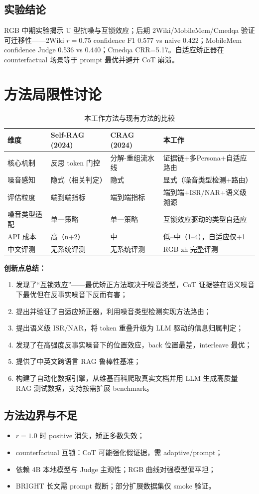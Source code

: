 \documentclass[UTF8,zihao=-4]{ctexart}
\begin{document}
\subsection{实验结论}
RGB 中期实验揭示 U 型抗噪与互锁效应；后期 2Wiki/MobileMem/Cmedqa 验证可迁移性——2Wiki $r=0.75$ confidence F1 0.577 vs naive 0.422；MobileMem confidence Judge 0.536 vs 0.440；Cmedqa CRR=5.17。自适应矫正器在 counterfactual 场景等于 prompt 最优并避开 CoT 崩溃。

\section{方法局限性讨论}

\begin{table}[H]
  \centering
  \caption{本工作方法与现有方法的比较}
  \begin{tabularx}{\textwidth}{lYYY}
    \toprule
    维度 & Self-RAG (2024) & CRAG (2024) & 本工作 \\
    \midrule
    核心机制 & 反思 token 门控 & 分解-重组流水线 & 证据链+多Persona+自适应路由 \\
    噪音感知 & 隐式（相关判定） & 隐式 & 显式（噪音类型检测+路由） \\
    评估粒度 & 端到端指标 & 端到端指标 & 端到端+ISR/NAR+语义级溯源 \\
    噪音类型适配 & 单一策略 & 单一策略 & 互锁效应驱动的类型自适应 \\
    API 成本 & 高（n+2） & 中 & 低--中（1--4），自适应仅+1 \\
    中文评测 & 无系统评测 & 无系统评测 & RGB zh 完整评测 \\
    \bottomrule
  \end{tabularx}
\end{table}

\textbf{创新点总结：}
\begin{enumerate}
  \item 发现了“互锁效应”——最优矫正方法取决于噪音类型，CoT 证据链在语义噪音下最优但在反事实噪音下反而有害；
  \item 提出并验证了自适应矫正器，利用噪音类型检测实现方法路由；
  \item 提出语义级 ISR/NAR，将 token 重叠升级为 LLM 驱动的信息归属判定；
  \item 发现了在高强度反事实噪音下的位置效应，back 位置最差，interleave 最优；
  \item 提供了中英文跨语言 RAG 鲁棒性基准；
  \item 构建了自动化数据引擎，从维基百科爬取真实文档并用 LLM 生成高质量 RAG 测试数据，支持按需扩展 benchmark。
\end{enumerate}



\subsection{方法边界与不足}
\begin{itemize}
  \item $r=1.0$ 时 positive 消失，矫正多数失效；
  \item counterfactual 互锁：CoT 可能强化假证据，需 adaptive/prompt；
  \item 依赖 4B 本地模型与 Judge 主观性；RGB 曲线对强模型偏平坦；
  \item BRIGHT 长文需 prompt 截断；部分扩展数据集仅 smoke 验证。
\end{itemize}
\end{document}
